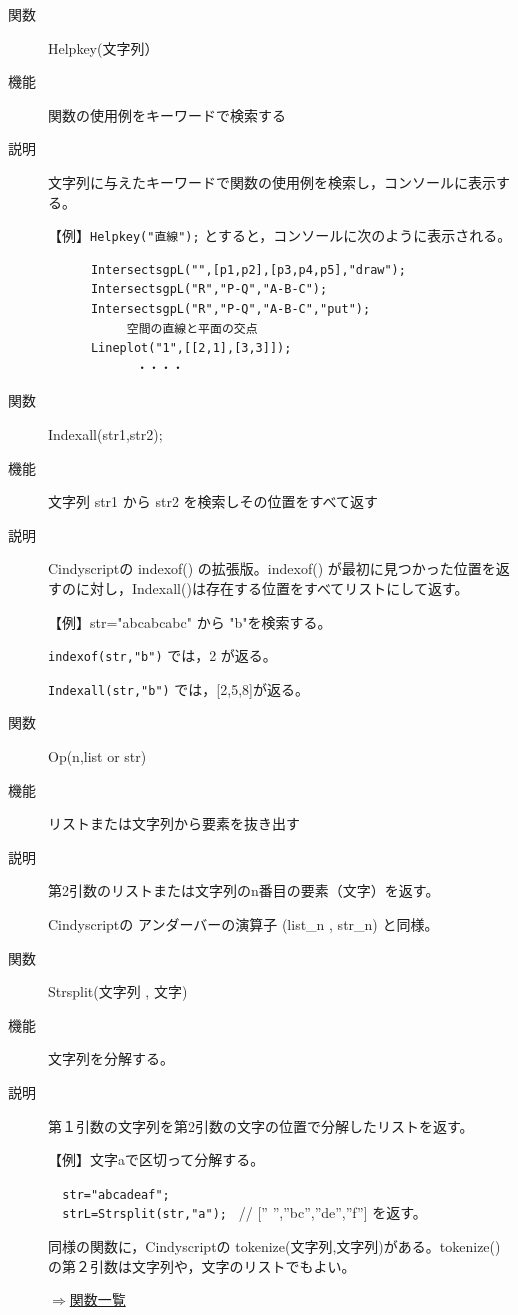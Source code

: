 \documentclass[papersize,a4paper,12pt,uplatex]{jsarticle}
\begin{document}
\begin{description}
\vspace{\baselineskip}
\hypertarget{helpkey}{}
\item[関数]  Helpkey(文字列）
\item[機能]  関数の使用例をキーワードで検索する
\item[説明]  文字列に与えたキーワードで関数の使用例を検索し，コンソールに表示する。

\vspace{\baselineskip}
【例】\verb|Helpkey("直線");|  とすると，コンソールに次のように表示される。
\begin{verbatim}
      IntersectsgpL("",[p1,p2],[p3,p4,p5],"draw"); 
      IntersectsgpL("R","P-Q","A-B-C"); 
      IntersectsgpL("R","P-Q","A-B-C","put");
           空間の直線と平面の交点
      Lineplot("1",[[2,1],[3,3]]);
         　　・・・・
\end{verbatim}

\vspace{\baselineskip}
\hypertarget{indexall}{}
\item[関数]  Indexall(str1,str2);
\item[機能]  文字列 str1 から str2 を検索しその位置をすべて返す
\item[説明]  Cindyscriptの indexof() の拡張版。indexof() が最初に見つかった位置を返すのに対し，Indexall()は存在する位置をすべてリストにして返す。

\vspace{\baselineskip}
【例】str="abcabcabc" から "b"を検索する。

 \verb|indexof(str,"b")| では，2 が返る。
 
 \verb|Indexall(str,"b")| では，[2,5,8]が返る。

\vspace{\baselineskip}
\hypertarget{op}{}
\item[関数]  Op(n,list or str)
\item[機能]  リストまたは文字列から要素を抜き出す
\item[説明]  第2引数のリストまたは文字列のn番目の要素（文字）を返す。

Cindyscriptの アンダーバーの演算子 (list\_n , str\_n) と同様。

\vspace{\baselineskip}
\hypertarget{strsplit}{}
\item[関数]  Strsplit(文字列 , 文字)
\item[機能]  文字列を分解する。
\item[説明]  第１引数の文字列を第2引数の文字の位置で分解したリストを返す。

\vspace{\baselineskip}
【例】文字aで区切って分解する。

\verb|  str="abcadeaf";| \\
\verb|  strL=Strsplit(str,"a"); |  //  [” ”,”bc”,”de”,”f”] を返す。

同様の関数に，Cindyscriptの tokenize(文字列,文字列)がある。tokenize() の第２引数は文字列や，文字のリストでもよい。

\begin{flushright}  \hyperlink{functionlist}{$\Rightarrow$関数一覧}\end{flushright}


\end{description}
\end{document}
